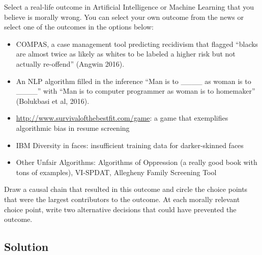 \documentclass[submit]{harvardml}
\begin{document}
\newpage

\begin{problem}

Select a real-life outcome in Artificial Intelligence or Machine Learning 
that you believe is morally wrong. You can select your own outcome from 
the news or select one of the outcomes in the options below:

\begin{itemize}
    \item COMPAS, a case management tool predicting recidivism that 
        flagged “blacks are almost twice as likely as whites to be 
        labeled a higher risk but not actually re-offend” (Angwin 
        2016).
        
    \item An NLP algorithm filled in the inference “Man is to 
        \_\_\_\_ as woman is to \_\_\_\_” with “Man is 
        to computer programmer as woman is to homemaker” (Bolukbasi 
        et al, 2016).
        
    \item \url{http://www.survivalofthebestfit.com/game}: a game that 
        exemplifies algorithmic bias in resume screening
        
    \item IBM Diversity in faces: insufficient training data for 
        darker-skinned faces
        
    \item Other Unfair Algorithms: Algorithms of Oppression (a really 
        good book with tons of examples), VI-SPDAT, Allegheny Family 
        Screening Tool
        
\end{itemize}
Draw a causal chain that resulted in this outcome and circle the choice points that were the largest contributors to the outcome. At each morally relevant choice point, write two alternative decisions that could have prevented the outcome.

\end{problem}

\subsection*{Solution}

\newpage
\end{document}
